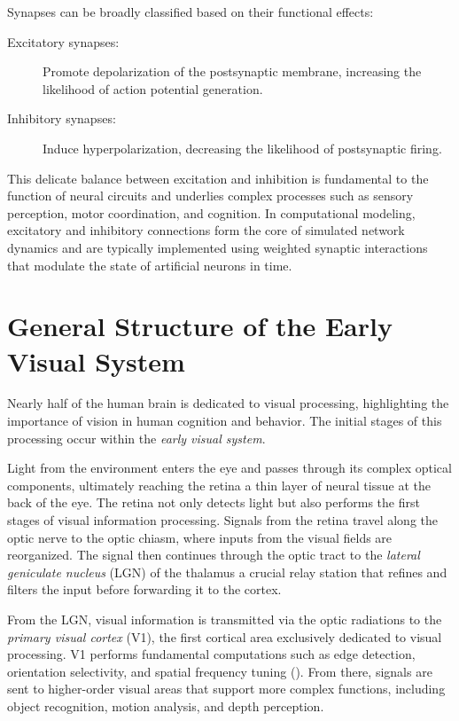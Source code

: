 Synapses can be broadly classified based on their functional effects:

\begin{description}
    \item[Excitatory synapses:] Promote depolarization of the postsynaptic membrane, increasing the likelihood of action potential generation.
    \item[Inhibitory synapses:] Induce hyperpolarization, decreasing the likelihood of postsynaptic firing.
\end{description}

This delicate balance between excitation and inhibition is fundamental to the function of neural circuits and underlies complex processes such as sensory perception, motor coordination, and cognition. In computational modeling, excitatory and inhibitory connections form the core of simulated network dynamics and are typically implemented using weighted synaptic interactions that modulate the state of artificial neurons in time.

\section{General Structure of the Early Visual System}
\label{sec:general_structure}

Nearly half of the human brain is dedicated to visual processing, highlighting the importance of vision in human cognition and behavior. The initial stages of this processing occur within the \emph{early visual system}.

Light from the environment enters the eye and passes through its complex optical components, ultimately reaching the retina a thin layer of neural tissue at the back of the eye. The retina not only detects light but also performs the first stages of visual information processing. Signals from the retina travel along the optic nerve to the optic chiasm, where inputs from the visual fields are reorganized. The signal then continues through the optic tract to the \emph{lateral geniculate nucleus} (LGN) of the thalamus a crucial relay station that refines and filters the input before forwarding it to the cortex.

From the LGN, visual information is transmitted via the optic radiations to the \emph{primary visual cortex} (V1), the first cortical area exclusively dedicated to visual processing. V1 performs fundamental computations such as edge detection, orientation selectivity, and spatial frequency tuning (\citet{bear2020neuroscience}). From there, signals are sent to higher-order visual areas that support more complex functions, including object recognition, motion analysis, and depth perception.

